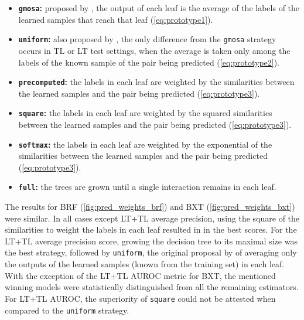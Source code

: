 \begin{itemize}
    \item \textbf{\texttt{gmosa}:} proposed by \textcite{pliakos2018global}, the output of each leaf is the average of the labels of the learned samples that reach that leaf (\autoref{eq:prototype1}).
    \item \textbf{\texttt{uniform}:} also proposed by \textcite{pliakos2018global}, the only difference from the \texttt{gmosa} strategy occurs in TL or LT test settings, when the average is taken only among the labels of the known sample of the pair being predicted (\autoref{eq:prototype2}).
    \item \textbf{\texttt{precomputed}:}
    the labels in each leaf are weighted by the similarities between the learned samples and the pair being predicted (\autoref{eq:prototype3}).
    \item \textbf{\texttt{square}:} the labels in each leaf are weighted by the squared similarities between the learned samples and the pair being predicted (\autoref{eq:prototype3}).
    \item \textbf{\texttt{softmax}:} the labels in each leaf are weighted by the exponential of the similarities between the learned samples and the pair being predicted (\autoref{eq:prototype3}).
    \item \textbf{\texttt{full}:} the trees are grown until a single interaction remains in each leaf. %
\end{itemize}


The results for BRF (\autoref{fig:pred_weights_brf}) and BXT (\autoref{fig:pred_weights_bxt}) were similar. In all cases except LT+TL average precision, using the square of the similarities to weight the labels in each leaf resulted in in the best scores. For the LT+TL average precision score, growing the decision tree to its maximal size was the best strategy, followed by \texttt{uniform}, the original proposal by \textcite{pliakos2018global} of averaging only the 
outputs of the learned samples (known from the training set) in each leaf. With the exception of the LT+TL AUROC metric for BXT, the mentioned winning models were statistically distinguished from all the remaining estimators. For LT+TL AUROC, the superiority of \texttt{square} could not be attested when compared to the \texttt{uniform} strategy.

